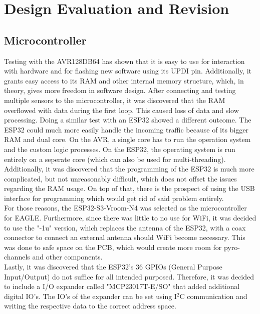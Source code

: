 \documentclass[fontsize=11pt,%
twoside,%
BCOR          = 8mm, %
DIV           = 11,  %
titlepage     = off,%
index=totoc,%
xcolor        = pdftex,%
dvipsnames,%
bibliography  = totoc,%
bibliography = numbered, %
listof        = notnumbered]{scrreprt}
\begin{document}
\section{Design Evaluation and Revision}

\subsection{Microcontroller}
Testing with the AVR128DB64 has shown that it is easy to use for interaction with hardware and for flashing new software using its UPDI pin. Additionally, it grants easy access to its RAM and other internal memory structure, which, in theory, gives more freedom in software design. After connecting and testing multiple sensors to the microcontroller, it was discovered that the RAM overflowed with data during the first loop. This caused loss of data and slow processing. Doing a similar test with an ESP32 showed a different outcome. The ESP32 could much more easily handle the incoming traffic because of its bigger RAM and dual core. On the AVR, a single core has to run the operation system and the custom logic processes. On the ESP32, the operating system is run entirely on a seperate core (which can also be used for multi-threading). Additionally, it was discovered that the programming of the ESP32 is much more complicated, but not unreasonably difficult, which does not offset the issues regarding the RAM usage. On top of that, there is the prospect of using the USB interface for programming which would get rid of said problem entirely.\\
For those reasons, the ESP32-S3-Vroom-N4 was selected as the microcontroller for EAGLE. Furthermore, since there was little to no use for WiFi, it was decided to use the "-1u" version, which replaces the antenna of the ESP32, with a coax connector to connect an external antenna should WiFi become necessary. This was done to safe space on the PCB, which would create more room for pyro-channels and other components.\\
Lastly, it was discovered that the ESP32's 36 GPIOs (General Purpose Input/Output) do not suffice for all intended purposed. Therefore, it was decided to include a I/O expander called "MCP23017T-E/SO" that added additional digital IO's. The IO's of the expander can be set using I$^2$C communication and writing the respective data to the correct address space.
\end{document}
